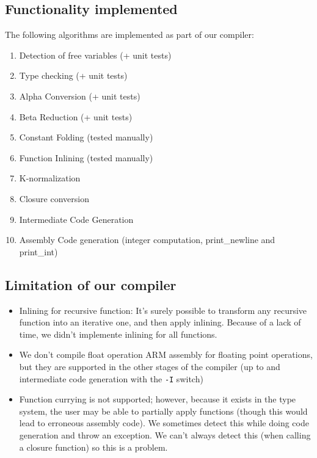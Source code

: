 \documentclass[a4paper,10pt]{article}
\begin{document}
	\subsection{Functionality implemented}
    	The following algorithms are implemented as part of our compiler:
		\begin{enumerate}
			\item Detection of free variables (+ unit tests)
			\item Type checking (+ unit tests)
			\item Alpha Conversion (+ unit tests)
			\item Beta Reduction (+ unit tests)
			\item Constant Folding (tested manually)
            \item Function Inlining (tested manually)
            \item K-normalization
            \item Closure conversion
			\item Intermediate Code Generation
			\item Assembly Code generation (integer computation, print\_newline and print\_int)
		\end{enumerate}

	\subsection{Limitation of our compiler}
		\begin{itemize}
			\item Inlining for recursive function: It's surely possible to transform any recursive function into an iterative one, and then apply inlining. Because of a lack of time, we didn't implemente inlining for all functions.
        	\item We don't compile float operation ARM assembly for floating point operations, but they are supported in the other stages of the compiler (up to and intermediate code generation with the \texttt{-I} switch)
        	\item Function currying is not supported; however, because it exists in the type system, the user may be able to partially apply functions (though this would lead to erroneous assembly code). We sometimes detect this while doing code generation and throw an exception. We can't always detect this (when calling a closure function) so this is a problem. 
		\end{itemize}
\end{document}
